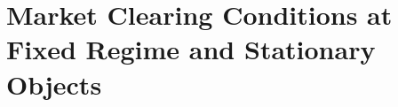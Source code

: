 \section{Market Clearing Conditions at Fixed Regime and Stationary Objects}
















































































































